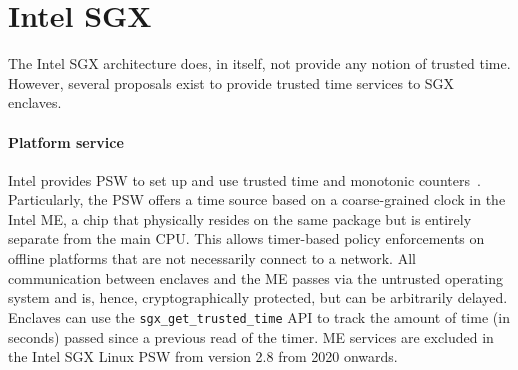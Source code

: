 \documentclass[sigplan,10pt]{acmart}
\begin{document}

\section{Intel SGX}
\label{arch:sgx}

The Intel SGX architecture does, in itself, not provide any notion of trusted
time. However, several proposals exist to provide trusted time services to SGX
enclaves.


\paragraph{Platform service}
Intel provides \ac{PSW} to set up and use trusted time and monotonic
counters~\cite{cen2017trusted}. Particularly, the PSW offers a \Ttwo{} time
source based on a coarse-grained clock in the Intel \ac{ME}, a chip that
physically resides on the same package but is entirely separate from the main
CPU. This allows timer-based policy enforcements on offline platforms that are
not necessarily connect to a network. All communication between enclaves and the
\ac{ME} passes via the untrusted operating system and is, hence,
cryptographically protected, but can be arbitrarily delayed. Enclaves can use
the \texttt{sgx\_get\_trusted\_time} API to track the amount of time (in
seconds) passed since a previous read of the timer.
%
ME services are excluded in the Intel SGX Linux PSW from version 2.8 from 2020
onwards.

%
\end{document}
